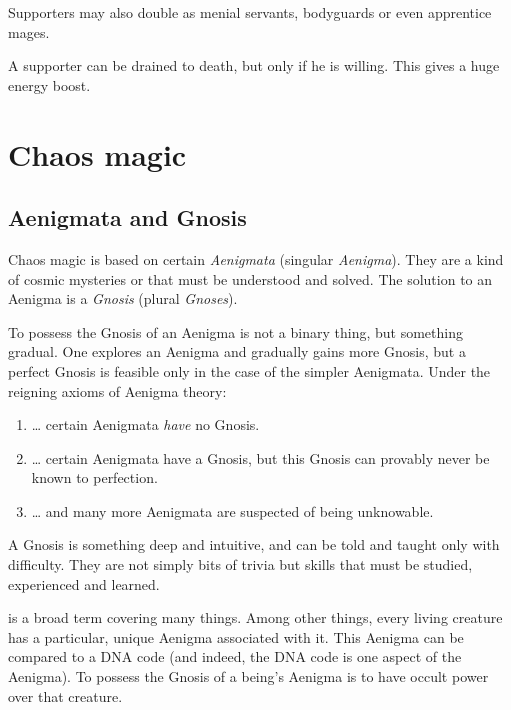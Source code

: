 Supporters may also double as menial servants, bodyguards or even apprentice mages. 

A supporter can be drained to death, but only if he is willing. This gives a huge energy boost. 

  















\section{Chaos magic}




\subsection{Aenigmata and Gnosis}
Chaos magic is based on certain \emph{Aenigmata} (singular \emph{Aenigma}). 
They are a kind of cosmic mysteries or  that must be understood and solved. 
The solution to an Aenigma is a \emph{Gnosis} (plural \emph{Gnoses}). 

To possess the Gnosis of an Aenigma is not a binary thing, but something gradual. 
One explores an Aenigma and gradually gains more Gnosis, but a perfect Gnosis is feasible only in the case of the simpler Aenigmata. 
Under the reigning axioms of Aenigma theory: 
\begin{enumerate}
  \item \ldots{} certain Aenigmata \emph{have} no Gnosis. 
  \item \ldots{} certain Aenigmata have a Gnosis, but this Gnosis can provably never be known to perfection. 
  \item \ldots{} and many more Aenigmata are suspected of being unknowable. 
\end{enumerate}

A Gnosis is something deep and intuitive, and can be told and taught only with difficulty. 
They are not simply bits of trivia but skills that must be studied, experienced and learned. 

 is a broad term covering many things. 
Among other things, every living creature has a particular, unique Aenigma associated with it. 
This Aenigma can be compared to a DNA code (and indeed, the DNA code is one aspect of the Aenigma). 
To possess the Gnosis of a being's Aenigma is to have occult power over that creature. 

